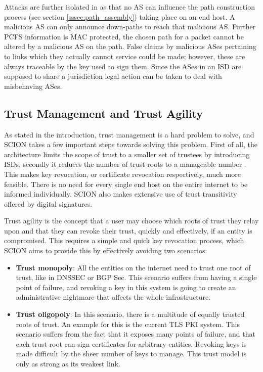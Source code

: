 \documentclass[../eva1_scion.tex]{subfiles}
\begin{document}
    Attacks are further isolated in as that no AS can influence the path construction process (see section \ref{sssec:path_assembly}) taking place on an end host. A malicious AS can only announce down-paths to reach that malicious AS. Further PCFS information is MAC protected, the chosen path for a packet cannot be altered by a malicious AS on the path. False claims by malicious ASes pertaining to links which they actually cannot service could be made; however, these are always traceable by the key used to sign them. Since the ASes in an ISD are supposed to share a  jurisdiction legal action can be taken to deal with misbehaving ASes.

    \subsection{Trust Management and Trust Agility} \label{ssec:trust_management}
    As stated in the introduction, trust management is a hard problem to solve, and SCION takes a few important steps towards solving this problem. First of all, the architecture limits the scope of trust to a smaller set of trustees by introducing ISDs, secondly it reduces the number of trust roots to a manageable number \cite{scion_2011}. This makes key revocation, or certificate revocation respectively, much more feasible.  There is no need for every single end host on the entire internet to be informed individually. SCION also makes extensive use of trust transitivity offered by digital signatures.

    Trust agility is the concept that a user may choose which roots of trust they relay upon and that they can revoke their trust, quickly and effectively, if an entity is compromised. This requires a simple and quick key revocation process, which SCION aims to provide this by effectively avoiding two scenarios:

    \begin{itemize}
        \item \textbf{Trust monopoly}: All the entities on the internet need to trust one root of trust, like in DNSSEC or BGP Sec. This scenario suffers from having a single point of failure, and revoking a key in this system is going to create an administrative nightmare that affects the whole infrastructure.
        \item  \textbf{Trust oligopoly}: In this scenario, there is a multitude of equally trusted roots of trust. An example for this is the current  TLS PKI system. This scenario suffers from the fact that it exposes many points of failure, and that each trust root can sign certificates for arbitrary entities. Revoking keys is made difficult by the sheer number of keys to manage. This trust model is only as strong as its weakest link.
    \end{itemize}
\end{document}

